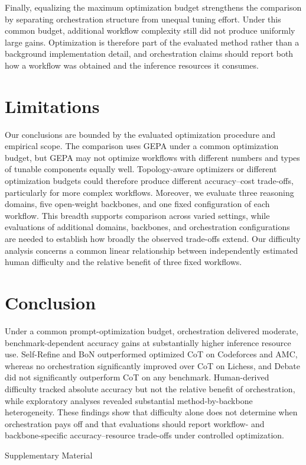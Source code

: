 \documentclass[a4paper]{article}
\theoremstyle{plain}
\theoremstyle{definition}
\theoremstyle{remark}
\begin{document}
Finally, equalizing the maximum optimization budget strengthens the comparison by separating orchestration structure from unequal tuning effort.
Under this common budget, additional workflow complexity still did not produce uniformly large gains.
Optimization is therefore part of the evaluated method rather than a background implementation detail, and orchestration claims should report both how a workflow was obtained and the inference resources it consumes.

\section{Limitations}
\label{limitations}

Our conclusions are bounded by the evaluated optimization procedure and empirical scope.
The comparison uses GEPA under a common optimization budget, but GEPA may not optimize workflows with different numbers and types of tunable components equally well.
Topology-aware optimizers or different optimization budgets could therefore produce different accuracy--cost trade-offs, particularly for more complex workflows.
Moreover, we evaluate three reasoning domains, five open-weight backbones, and one fixed configuration of each workflow.
This breadth supports comparison across varied settings, while evaluations of additional domains, backbones, and orchestration configurations are needed to establish how broadly the observed trade-offs extend.
Our difficulty analysis concerns a common linear relationship between independently estimated human difficulty and the relative benefit of three fixed workflows.

\section{Conclusion}
\label{conclusion}

Under a common prompt-optimization budget, orchestration delivered moderate, benchmark-dependent accuracy gains at substantially higher inference resource use.
Self-Refine and BoN outperformed optimized CoT on Codeforces and AMC, whereas no orchestration significantly improved over CoT on Lichess, and Debate did not significantly outperform CoT on any benchmark.
Human-derived difficulty tracked absolute accuracy but not the relative benefit of orchestration, while exploratory analyses revealed substantial method-by-backbone heterogeneity.
These findings show that difficulty alone does not determine when orchestration pays off and that evaluations should report workflow- and backbone-specific accuracy--resource trade-offs under controlled optimization.




\clearpage
\appendix
\onecolumn

\begin{center}
{\Large Supplementary Material}
\end{center}


\end{document}
